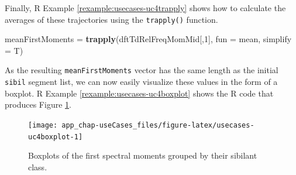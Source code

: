 \documentclass[]{book}
\newenvironment{Shaded}{\begin{snugshade}}{\end{snugshade}}
\newcommand{\CommentTok}[1]{\textcolor[rgb]{0.56,0.35,0.01}{\textit{#1}}}
\newcommand{\DataTypeTok}[1]{\textcolor[rgb]{0.13,0.29,0.53}{#1}}
\newcommand{\DecValTok}[1]{\textcolor[rgb]{0.00,0.00,0.81}{#1}}
\newcommand{\FloatTok}[1]{\textcolor[rgb]{0.00,0.00,0.81}{#1}}
\newcommand{\KeywordTok}[1]{\textcolor[rgb]{0.13,0.29,0.53}{\textbf{#1}}}
\newcommand{\NormalTok}[1]{#1}
\newcommand{\OperatorTok}[1]{\textcolor[rgb]{0.81,0.36,0.00}{\textbf{#1}}}
\newcommand{\StringTok}[1]{\textcolor[rgb]{0.31,0.60,0.02}{#1}}
\theoremstyle{definition}
\theoremstyle{definition}
\theoremstyle{definition}
\theoremstyle{remark}
\begin{document}
\begin{Shaded}
\end{Shaded}

Finally, R Example \ref{rexample:usecases-uc4trapply} shows how to
calculate the averages of these trajectories using the
\texttt{trapply()} function.

\begin{Shaded}
\begin{Highlighting}[]
\NormalTok{meanFirstMoments =}\StringTok{ }\KeywordTok{trapply}\NormalTok{(dftTdRelFreqMomMid[,}\DecValTok{1}\NormalTok{],}
                           \DataTypeTok{fun =}\NormalTok{ mean,}
                           \DataTypeTok{simplify =}\NormalTok{ T)}
\end{Highlighting}
\end{Shaded}

As the resulting \texttt{meanFirstMoments} vector has the same length as
the initial \texttt{sibil} segment list, we can now easily visualize
these values in the form of a boxplot. R Example
\ref{rexample:usecases-uc4boxplot} shows the R code that produces Figure
\ref{fig:usecases-uc4boxplot}.

\begin{Shaded}
\end{Shaded}

\begin{figure}

{\centering \texttt{[image: app\_chap-useCases\_files/figure-latex/usecases-uc4boxplot-1]} 

}

\caption{Boxplots of the first spectral moments grouped by their sibilant class.}\label{fig:usecases-uc4boxplot}
\end{figure}
\end{document}
